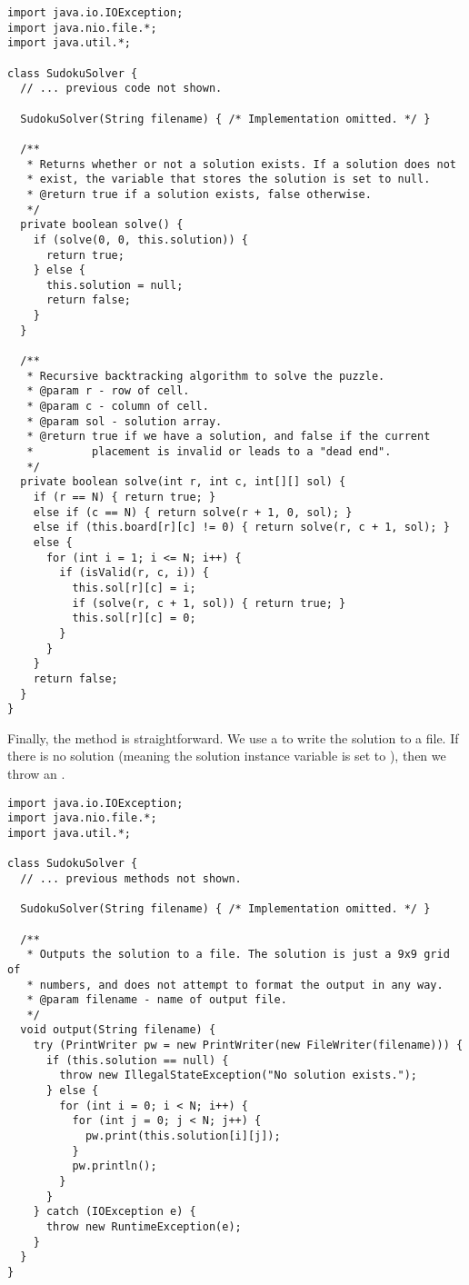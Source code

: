 \begin{lstlisting}[language=MyJava]
import java.io.IOException;
import java.nio.file.*;
import java.util.*;

class SudokuSolver {
  // ... previous code not shown.

  SudokuSolver(String filename) { /* Implementation omitted. */ }

  /**
   * Returns whether or not a solution exists. If a solution does not 
   * exist, the variable that stores the solution is set to null.
   * @return true if a solution exists, false otherwise.
   */
  private boolean solve() {
    if (solve(0, 0, this.solution)) { 
      return true; 
    } else { 
      this.solution = null; 
      return false;
    }
  }

  /**
   * Recursive backtracking algorithm to solve the puzzle. 
   * @param r - row of cell.
   * @param c - column of cell.
   * @param sol - solution array.
   * @return true if we have a solution, and false if the current
   *         placement is invalid or leads to a "dead end".
   */ 
  private boolean solve(int r, int c, int[][] sol) {
    if (r == N) { return true; }
    else if (c == N) { return solve(r + 1, 0, sol); }
    else if (this.board[r][c] != 0) { return solve(r, c + 1, sol); }
    else {
      for (int i = 1; i <= N; i++) {
        if (isValid(r, c, i)) {
          this.sol[r][c] = i;
          if (solve(r, c + 1, sol)) { return true; }
          this.sol[r][c] = 0;
        }
      }
    }
    return false;
  }
}
\end{lstlisting}

Finally, the  method is straightforward. 
We use a  to write the solution to a file. 
If there is no solution (meaning the solution instance variable is set to ), then we throw an .

\begin{lstlisting}[language=MyJava]
import java.io.IOException;
import java.nio.file.*;
import java.util.*;

class SudokuSolver {
  // ... previous methods not shown.

  SudokuSolver(String filename) { /* Implementation omitted. */ }

  /**
   * Outputs the solution to a file. The solution is just a 9x9 grid of 
   * numbers, and does not attempt to format the output in any way.
   * @param filename - name of output file.
   */
  void output(String filename) {
    try (PrintWriter pw = new PrintWriter(new FileWriter(filename))) {
      if (this.solution == null) { 
        throw new IllegalStateException("No solution exists."); 
      } else {
        for (int i = 0; i < N; i++) {
          for (int j = 0; j < N; j++) {
            pw.print(this.solution[i][j]);
          }
          pw.println();
        }
      }
    } catch (IOException e) {
      throw new RuntimeException(e);
    }
  }
}
\end{lstlisting}


